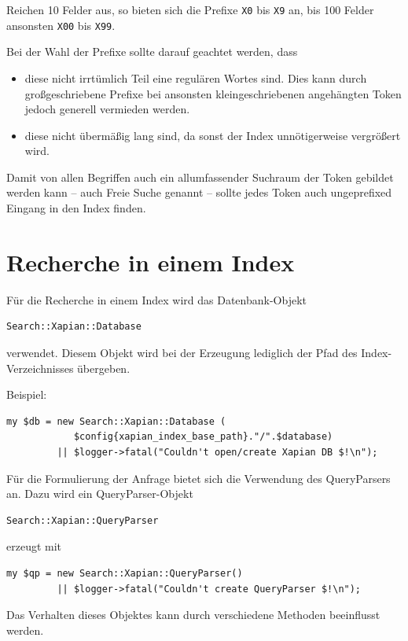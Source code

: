 \documentclass[11pt, twoside, a4paper, BCOR8mm, DIV12, bibtotoc,idxtotoc]{scrbook}
\begin{document}
Reichen 10 Felder aus, so bieten sich die Prefixe \texttt{X0} bis
\texttt{X9} an, bis 100 Felder ansonsten \texttt{X00} bis
\texttt{X99}.

Bei der Wahl der Prefixe sollte darauf geachtet werden, dass

\begin{itemize}
\item diese nicht irrtümlich Teil eine regulären Wortes sind. Dies kann
  durch großgeschriebene Prefixe bei ansonsten kleingeschriebenen
  angehängten Token jedoch generell vermieden werden.
\item diese nicht übermäßig lang sind, da sonst der Index unnötigerweise
  vergrößert wird.
\end{itemize}

Damit von allen Begriffen auch ein allumfassender Suchraum der Token
gebildet werden kann -- auch Freie Suche genannt -- sollte jedes Token
auch ungeprefixed Eingang in den Index finden.

\section{Recherche in einem Index}

Für die Recherche in einem Index wird das Datenbank-Objekt
\begin{verbatim}
Search::Xapian::Database
\end{verbatim}
verwendet. Diesem Objekt wird bei der Erzeugung lediglich der Pfad des
Index-Verzeichnisses übergeben.

Beispiel:

\begin{verbatim}
my $db = new Search::Xapian::Database (
            $config{xapian_index_base_path}."/".$database) 
         || $logger->fatal("Couldn't open/create Xapian DB $!\n");
\end{verbatim}

Für die Formulierung der Anfrage bietet sich die Verwendung des
QueryParsers an. Dazu wird ein QueryParser-Objekt 
\begin{verbatim}
Search::Xapian::QueryParser
\end{verbatim}

erzeugt mit

\begin{verbatim}
my $qp = new Search::Xapian::QueryParser() 
         || $logger->fatal("Couldn't create QueryParser $!\n");
\end{verbatim}

Das Verhalten dieses Objektes kann durch verschiedene Methoden
beeinflusst werden.
\end{document}

